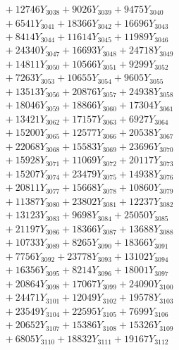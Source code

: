 \documentclass[a4paper,10pt]{article}
\begin{document}
{\begin{align}
&\;  + 12746 Y_{3038} + 9026 Y_{3039} + 9475 Y_{3040} \\[0.3ex]
&\;  + 6541 Y_{3041} + 18366 Y_{3042} + 16696 Y_{3043} \\[0.3ex]
&\;  + 8414 Y_{3044} + 11614 Y_{3045} + 11989 Y_{3046} \\[0.3ex]
&\;  + 24340 Y_{3047} + 16693 Y_{3048} + 24718 Y_{3049} \\[0.3ex]
&\;  + 14811 Y_{3050} + 10566 Y_{3051} + 9299 Y_{3052} \\[0.3ex]
&\;  + 7263 Y_{3053} + 10655 Y_{3054} + 9605 Y_{3055} \\[0.3ex]
&\;  + 13513 Y_{3056} + 20876 Y_{3057} + 24938 Y_{3058} \\[0.5ex]\allowbreak
&\;  + 18046 Y_{3059} + 18866 Y_{3060} + 17304 Y_{3061} \\[0.3ex]
&\;  + 13421 Y_{3062} + 17157 Y_{3063} + 6927 Y_{3064} \\[0.3ex]
&\;  + 15200 Y_{3065} + 12577 Y_{3066} + 20538 Y_{3067} \\[0.3ex]
&\;  + 22068 Y_{3068} + 15583 Y_{3069} + 23696 Y_{3070} \\[0.3ex]
&\;  + 15928 Y_{3071} + 11069 Y_{3072} + 20117 Y_{3073} \\[0.3ex]
&\;  + 15207 Y_{3074} + 23479 Y_{3075} + 14938 Y_{3076} \\[0.3ex]
&\;  + 20811 Y_{3077} + 15668 Y_{3078} + 10860 Y_{3079} \\[0.3ex]
&\;  + 11387 Y_{3080} + 23802 Y_{3081} + 12237 Y_{3082} \\[0.3ex]
&\;  + 13123 Y_{3083} + 9698 Y_{3084} + 25050 Y_{3085} \\[0.3ex]
&\;  + 21197 Y_{3086} + 18366 Y_{3087} + 13688 Y_{3088} \\[0.5ex]\allowbreak
&\;  + 10733 Y_{3089} + 8265 Y_{3090} + 18366 Y_{3091} \\[0.3ex]
&\;  + 7756 Y_{3092} + 23778 Y_{3093} + 13102 Y_{3094} \\[0.3ex]
&\;  + 16356 Y_{3095} + 8214 Y_{3096} + 18001 Y_{3097} \\[0.3ex]
&\;  + 20864 Y_{3098} + 17067 Y_{3099} + 24090 Y_{3100} \\[0.3ex]
&\;  + 24471 Y_{3101} + 12049 Y_{3102} + 19578 Y_{3103} \\[0.3ex]
&\;  + 23549 Y_{3104} + 22595 Y_{3105} + 7699 Y_{3106} \\[0.3ex]
&\;  + 20652 Y_{3107} + 15386 Y_{3108} + 15326 Y_{3109} \\[0.3ex]
&\;  + 6805 Y_{3110} + 18832 Y_{3111} + 19167 Y_{3112} \\[0.3ex]

\end{align}}
\end{document}
